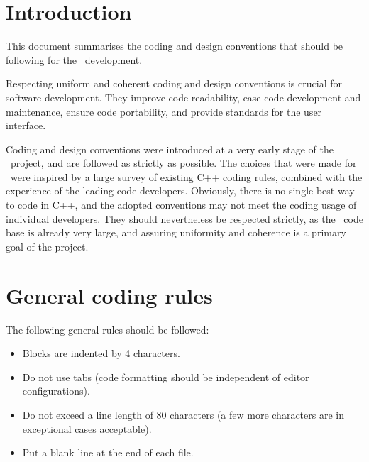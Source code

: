 \documentclass{article}[12pt,a4]
\begin{document}
\frontpage


\section{Introduction}

This document summarises the coding and design conventions that should be following for
the \this\ development.

Respecting uniform and coherent coding and design conventions is crucial for software
development.
They improve code readability, ease code development and maintenance, ensure code
portability, and provide standards for the user interface.

Coding and design conventions were introduced at a very early stage of the \this\ project, and
are followed as strictly as possible.
The choices that were made for \this\ were inspired by a large survey of existing C++ coding
rules, combined with the experience of the leading code developers.
Obviously, there is no single best way to code in C++, and the adopted conventions may not
meet the coding usage of individual developers.
They should nevertheless be respected strictly, as the \this\ code base is already very large,
and assuring uniformity and coherence is a primary goal of the project.


\section{General coding rules}

The following general rules should be followed:
\begin{itemize}
\item Blocks are indented by 4 characters.
\item Do not use tabs (code formatting should be independent of editor configurations).
\item Do not exceed a line length of 80 characters (a few more characters are in exceptional cases acceptable).
\item Put a blank line at the end of each file.
\end{itemize}
\end{document}
